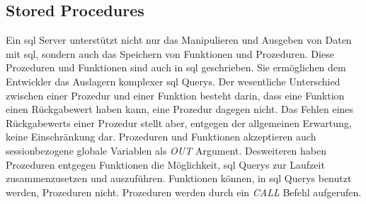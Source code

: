\subsection{Stored Procedures}\label{subsec:storedProc}
Ein \ac{sql} Server unterstützt nicht nur das Manipulieren und Ausgeben von Daten mit \ac{sql}, sondern auch das Speichern von Funktionen und Prozeduren.
Diese Prozeduren und Funktionen sind auch in \ac{sql} geschrieben.
Sie ermöglichen dem Entwickler das Auslagern komplexer \ac{sql} Querys.
Der wesentliche Unterschied zwischen einer Prozedur und einer Funktion besteht darin, dass eine Funktion einen Rückgabewert haben kann, eine Prozedur dagegen nicht.
Das Fehlen eines Rückgabewerts einer Prozedur stellt aber, entgegen der allgemeinen Erwartung, keine Einschränkung dar. 
Prozeduren und Funktionen akzeptieren auch sessionbezogene globale Variablen als \emph{OUT} Argument. 
Desweiteren haben Prozeduren entgegen Funktionen die Möglichkeit, \ac{sql} Querys zur Laufzeit zusammenzusetzen und auszuführen.
Funktionen können, in \ac{sql} Querys benutzt werden, Prozeduren nicht.
Prozeduren werden durch ein \emph{CALL} Befehl aufgerufen.

